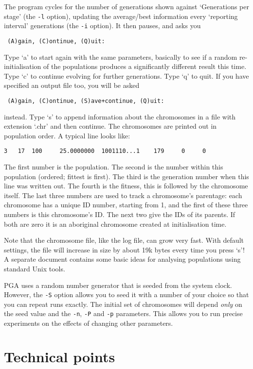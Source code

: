 The program cycles for the number of generations shown against
`Generations per stage' (the \verb|-l| option), updating the
average/best information every `reporting interval' generations (the
\verb|-i| option). It then pauses, and asks you
\begin{verbatim}
 (A)gain, (C)ontinue, (Q)uit:
\end{verbatim}
Type `a' to start again with the same parameters, basically to see
if a random re-initialisation of the populations produces a
significantly different result this time. Type `c' to continue evolving
for further generations. Type `q' to quit. If you have specified an
output file too, you will be asked
\begin{verbatim}
 (A)gain, (C)ontinue, (S)ave+continue, (Q)uit:
\end{verbatim}
instead. Type `s' to append information about the chromosomes in a
file with extension `.chr' and then continue. The chromosomes are
printed out in population order. A typical line looks like:
\begin{verbatim}
3   17  100     25.0000000  1001110...1    179     0     0
\end{verbatim}
The first number is the population. The second is the number within
this population (ordered; fittest is first). The third is the generation
number when this line was written out. The fourth is the fitness, this
is followed by the chromosome itself. The last three numbers are used
to track a chromosome's parentage: each chromosome has a unique ID
number, starting from 1, and the first of these three numbers is this
chromosome's ID. The next two give the IDs of its parents. If both
are zero it is an aboriginal chromosome created at initialisation
time.

Note that the chromosome file, like the log file, can grow very fast.
With default settings, the file will increase in size by about 19k bytes
every time you press `s'! A separate document contains some basic ideas
for analysing populations using standard Unix tools.

PGA uses a random number generator that is seeded from the system
clock. However, the \verb|-S| option allows you to seed it with a
number of your choice so that you can repeat runs exactly. The initial
set of chromosomes will depend {\em only} on the seed value and the
\verb|-n|, \verb|-P| and \verb|-p| parameters. This allows you to run
precise experiments on the effects of changing other parameters.

\section*{Technical points}

